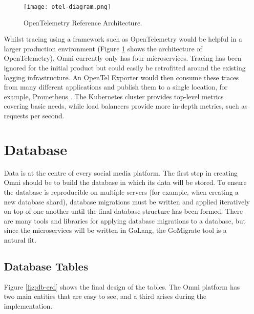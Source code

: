 

\begin{figure}[htbp]
\texttt{[image: otel-diagram.png]}
\centering
\caption{OpenTelemetry Reference Architecture.}
\label{fig:opentel-overview}
\end{figure}

Whilst tracing using a framework such as OpenTelemetry would be helpful in a larger production environment (Figure \ref{fig:opentel-overview} shows the architecture of OpenTelemetry\footnotemark{}), Omni currently only has four microservices.
Tracing has been ignored for the initial product but could easily be retrofitted around the existing logging infrastructure.
An OpenTel Exporter would then consume these traces from many different applications and publish them to a single location, for example, \underline{\href{https://prometheus.io}{Prometheus}} \nocite{prometheus}. 
The Kubernetes cluster provides top-level metrics covering basic needs, while load balancers provide more in-depth metrics, such as requests per second.

\section{Database}
\label{sec:impl-database}
Data is at the centre of every social media platform. The first step in creating Omni should be to build the database in which its data will be stored.
To ensure the database is reproducible on multiple servers (for example, when creating a new database shard), database migrations must be written and applied iteratively on top of one another until the final database structure has been formed. 
There are many tools and libraries for applying database migrations to a database, but since the microservices will be written in GoLang, the GoMigrate tool is a natural fit.

\subsection{Database Tables}
Figure \ref{fig:db-erd} shows the final design of the tables. The Omni platform has two main entities that are easy to see, and a third arises during the implementation.


